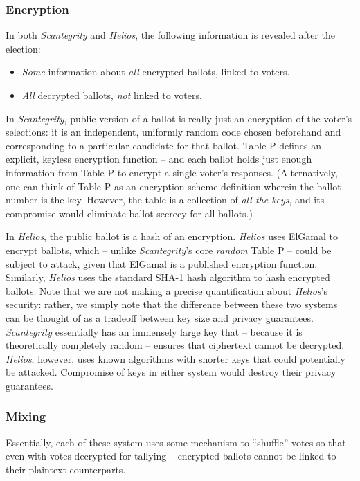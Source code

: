 \documentclass[10pt,twocolumn]{article}
\newcommand{\term}[1]{\textit{#1}}
\begin{document}
\subsubsection{Encryption}

In both \term{Scantegrity} and \term{Helios}, the following information is revealed after the election:
\begin{itemize}
	\item
		\emph{Some} information about \emph{all} encrypted ballots, linked to voters.
	\item
		\emph{All} decrypted ballots, \emph{not} linked to voters.
\end{itemize}

In \term{Scantegrity}, public version of a ballot is really just an encryption of the voter's
selections: it is an independent, uniformly random code chosen beforehand and corresponding to a
particular candidate for that ballot. Table P defines an explicit, keyless encryption
function -- and each ballot holds just enough information from Table P to encrypt a single voter's
responses. (Alternatively, one can think of Table P as an encryption scheme definition wherein the
ballot number is the key. However, the table is a collection of \emph{all the keys}, and its
compromise would eliminate ballot secrecy for all ballots.)

In \term{Helios}, the public ballot is a hash of an encryption. \term{Helios} uses ElGamal to encrypt ballots,
which -- unlike \term{Scantegrity}'s core \emph{random} Table P -- could be subject to attack, given that
ElGamal is a published encryption function. Similarly, \term{Helios} uses the standard SHA-1 hash algorithm
to hash encrypted ballots. Note that we are not making a precise quantification about \term{Helios}'s
security: rather, we simply note that the difference between these two systems can be thought of as
a tradeoff between key size and privacy guarantees. \term{Scantegrity} essentially has an immensely large
key that -- because it is theoretically completely random -- ensures that ciphertext cannot be
decrypted. \term{Helios}, however, uses known algorithms with shorter keys that could potentially be
attacked. Compromise of keys in either system would destroy their privacy guarantees.

\subsubsection{Mixing}

Essentially, each of these system uses some mechanism to ``shuffle'' votes so that -- even
with votes decrypted for tallying -- encrypted ballots cannot be linked to their plaintext
counterparts.
\end{document}
